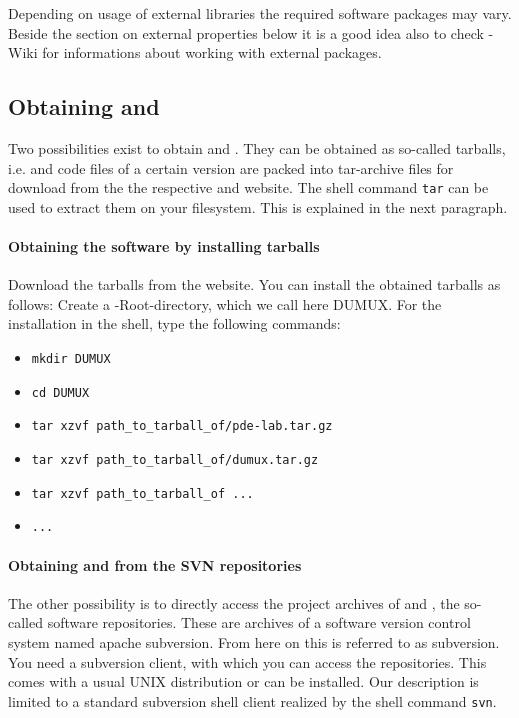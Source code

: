 Depending on usage of external libraries the required software packages may vary. Beside the section on external properties below it is a good idea also to check \Dune-Wiki for informations about working with external packages. \\

\subsection{Obtaining \Dune and \Dumux}
Two possibilities exist to obtain \Dune and \Dumux. They can be obtained as so-called tarballs, i.e. \Dumux and \Dune code files of a certain version are packed into tar-archive files for download from the the respective {\Dune} and {\Dumux} website. The shell command \texttt{tar} can be used to extract them on your filesystem. This is explained in the next paragraph. 

\paragraph{Obtaining the software by installing tarballs}
Download the tarballs from the website. You can install the obtained tarballs as follows: Create a \Dune-Root-directory, which we call here DUMUX. For the installation in the shell, type the following commands: 
\begin{itemize}
\item \texttt{mkdir DUMUX}
\item \texttt{cd DUMUX}
\item \texttt{tar xzvf path\_to\_tarball\_of/pde-lab.tar.gz}
\item \texttt{tar xzvf path\_to\_tarball\_of/dumux.tar.gz}
\item \texttt{tar xzvf path\_to\_tarball\_of ...}
\item \texttt{...}
\end{itemize} 

\paragraph{Obtaining \Dune and \Dumux from the SVN repositories} 
The other possibility is to directly access the project archives of \Dune and \Dumux, the so-called software repositories. These are archives of a software version control system named apache subversion. From here on this is referred to as subversion.
You need a subversion client, with which you can access the repositories. This comes with a usual UNIX distribution or can be installed. Our description is limited to a standard subversion shell client realized by the shell command \texttt{svn}.

